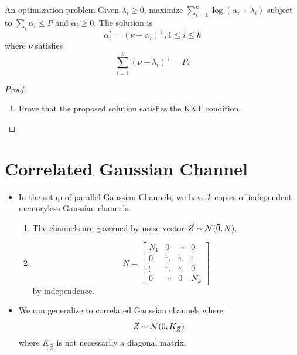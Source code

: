 \documentclass[../main.tex]{subfiles}
\begin{document}
\begin{bbox}{An optimization problem}
    Given $\lambda_i\geq 0$, maximize $\sum_{i=1}^k\log(\alpha_i+\lambda_i)$ subject to $\sum_i\alpha_i \leq P$ and $\alpha_i\geq 0$. 
    \newline
    The solution is \[
    \alpha_i^* = (\nu-\alpha_i)^+, 1\leq i\leq k
    \] where $\nu$ satisfies \[
    \sum_{i=1}^k(\nu-\lambda_i)^+=P.
    \]
    \begin{proof}
        \begin{enumerate}
            \item Prove that the proposed solution satisfies the KKT condition.
        \end{enumerate}
    \end{proof}
\end{bbox}
\section{Correlated Gaussian Channel}
\begin{itemize}
    \item In the setup of parallel Gaussian Channels, we have $k$ copies of independent memoryless Gaussian channels. \begin{enumerate}
        \item The channels are governed by noise vector $\vec Z\sim \mathcal{N}(\vec 0,N)$.
        \item \[
        N = \begin{bmatrix}
        N_1 & 0 & \cdots & 0 \\
        0 & \ddots & \ddots & \vdots \\
        \vdots & \ddots & \ddots & 0 \\
        0 & \cdots & 0 & N_k
        \end{bmatrix}
        \] by independence.
    \end{enumerate}
    \item We can generalize to correlated Gaussian channels where \[
    \vec Z \sim \mathcal{N}(0,K_{\vec Z})
    \] where $K_{\vec Z}$ is not necessarily a diagonal matrix.
\end{itemize}
\end{document}
